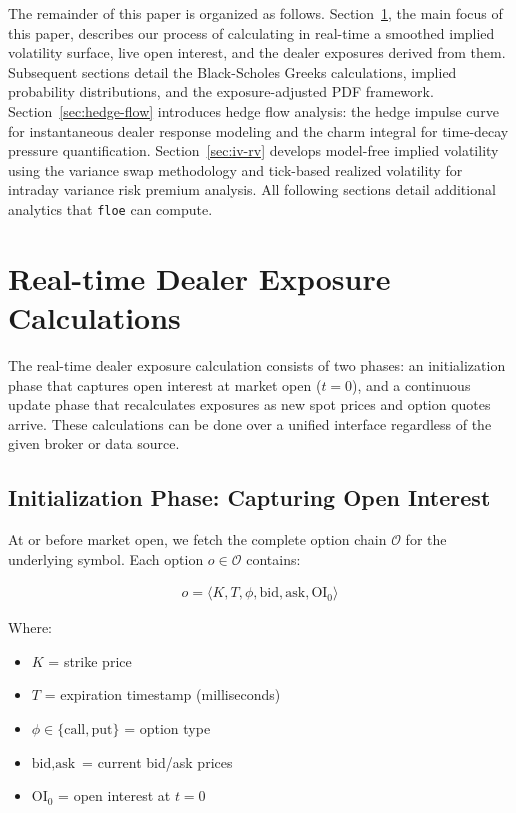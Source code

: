 \documentclass[11pt, a4paper]{article}
\begin{document}
The remainder of this paper is organized as follows. Section~\ref{sec:realtime-dealer-exposure-calculations}, the main focus of this paper, describes our process of calculating in real-time a smoothed implied volatility surface, live open interest, and the dealer exposures derived from them. Subsequent sections detail the Black-Scholes Greeks calculations, implied probability distributions, and the exposure-adjusted PDF framework. Section~\ref{sec:hedge-flow} introduces hedge flow analysis: the hedge impulse curve for instantaneous dealer response modeling and the charm integral for time-decay pressure quantification. Section~\ref{sec:iv-rv} develops model-free implied volatility using the variance swap methodology and tick-based realized volatility for intraday variance risk premium analysis. All following sections detail additional analytics that \texttt{floe} can compute.

\section{Real-time Dealer Exposure Calculations}
\label{sec:realtime-dealer-exposure-calculations}

The real-time dealer exposure calculation consists of two phases: an initialization phase that captures open interest at market open ($t=0$), and a continuous update phase that recalculates exposures as new spot prices and option quotes arrive. These calculations can be done over a unified interface regardless of the given broker or data source.

\subsection{Initialization Phase: Capturing Open Interest}

At or before market open, we fetch the complete option chain $\mathcal{O}$ for the underlying symbol. Each option $o \in \mathcal{O}$ contains:

\begin{align*}
o = \langle K, T, \phi, \text{bid}, \text{ask}, \text{OI}_0 \rangle
\end{align*}

Where:
\begin{itemize}
    \item $K$ = strike price
    \item $T$ = expiration timestamp (milliseconds)
    \item $\phi \in \{\text{call}, \text{put}\}$ = option type
    \item $\text{bid}, \text{ask}$ = current bid/ask prices
    \item $\text{OI}_0$ = open interest at $t=0$
\end{itemize}
\end{document}
